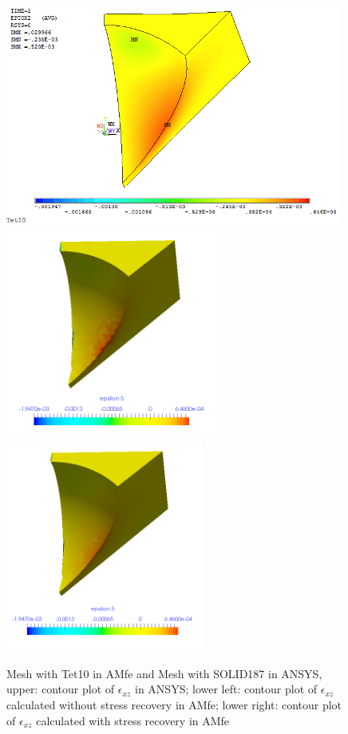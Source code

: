 \begin{figure}[htbp]
	\begin{center}
		\includegraphics[width=11cm,clip]{Tet10_Exz.png} 
		\includegraphics[width=7cm,clip]{Tet10_Exz_PD.png} 			
		\includegraphics[width=6.5cm,clip]{Tet10_Exz_P.png} 		
		\caption{Mesh with Tet10 in AMfe and Mesh with SOLID187 in ANSYS, upper: contour plot of $\epsilon_{xz}$ in ANSYS; lower left: contour plot of $\epsilon_{xz}$ calculated without stress recovery in AMfe; lower right: contour plot of $\epsilon_{xz}$ calculated with stress recovery in AMfe} \label{fig: Tet10_Exz}
	\end{center}
\end{figure}
\clearpage 

